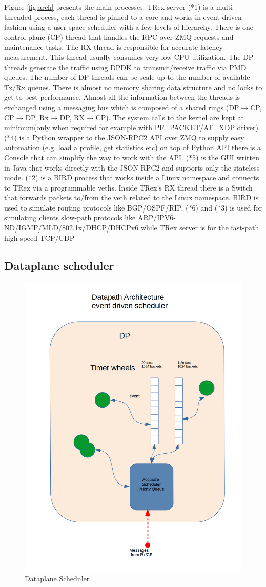 \documentclass[letterpaper]{article}
\begin{document}
Figure \ref{fig:arch} presents the main processes. TRex server (*1) is a multi-threaded process, each thread is pinned to a core and works in 
event driven fashion using a user-space scheduler with a few levels of hierarchy. There is one control-plane (CP) thread that handles the RPC over ZMQ requests and maintenance tasks. 
The RX thread is responsible for accurate latency measurement. This thread usually consumes very low CPU utilization. 
The DP threads generate the traffic using DPDK to transmit/receive traffic via PMD queues. 
The number of DP threads can be scale up to the number of available Tx/Rx queues. 
There is almost no memory sharing data structure and no locks to get to best performance. 
Almost all the information between the threads is exchanged using a messaging bus which 
is composed of a shared rings (DP$\rightarrow$CP, CP$\rightarrow$DP, Rx$\rightarrow$DP, RX$\rightarrow$CP).
The system calls to the kernel are kept at minimum(only when required for example with PF\_PACKET/AF\_XDP driver)
(*4) is a Python wrapper to the JSON-RPC2 API over ZMQ to supply easy automation (e.g. load a profile, get statistics etc)
on top of Python API there is a Console that can simplify the way to work with the API. 
(*5) is the GUI written in Java that works directly with the JSON-RPC2 and supports only the stateless mode.
(*2) is a BIRD \cite{b4} process that works inside a Linux namespace and connects to TRex via a programmable veths. Inside TRex's RX thread there is a Switch that forwards packets to/from the veth related to the Linux namespace. 
BIRD is used to simulate routing protocols like BGP/OSPF/RIP.
(*6) and (*3) is used for simulating clients slow-path protocols like ARP/IPV6-ND/IGMP/MLD/802.1x/DHCP/DHCPv6 while TRex server is for the fast-path high speed TCP/UDP

\subsection{Dataplane scheduler}

\begin{figure}[h]
\includegraphics[width=0.3
\textwidth, center]{trex_dp_sheduler.png}
\caption{Dataplane Scheduler}
\label{fig:dp_schduler}
\end{figure}
  
\end{document}
